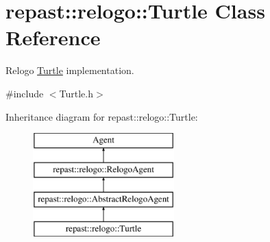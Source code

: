 \hypertarget{classrepast_1_1relogo_1_1_turtle}{\section{repast\-:\-:relogo\-:\-:Turtle Class Reference}
\label{classrepast_1_1relogo_1_1_turtle}
}


Relogo \hyperlink{classrepast_1_1relogo_1_1_turtle}{Turtle} implementation.  




{\ttfamily \#include $<$Turtle.\-h$>$}

Inheritance diagram for repast\-:\-:relogo\-:\-:Turtle\-:\begin{figure}[H]
\begin{center}
\leavevmode
\includegraphics[height=4.000000cm]{classrepast_1_1relogo_1_1_turtle}
\end{center}
\end{figure}
